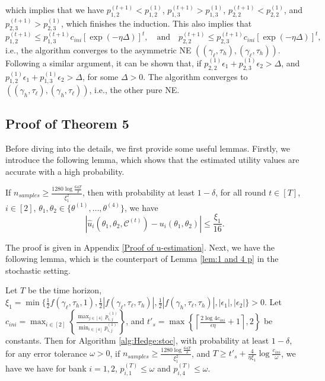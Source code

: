 which implies that we have $p^{(t+1)}_{1,2}< p^{(1)}_{1,2}$,  $p^{(t+1)}_{1,3}> p^{(1)}_{1,3}$, $p^{(t+1)}_{2,2}<p^{(1)}_{2,2}$, and $p^{(t+1)}_{2,3}>p^{(1)}_{2,3}$, which finishes the induction. This also implies that 
\[
p^{(t+1)}_{1,2}\leq p^{(t+1)}_{1,3}c_{ini}\left[\exp(-\eta \Delta)\right]^t, \quad \text{and} \quad p^{(t+1)}_{2,2}\leq p^{(t+1)}_{2,3}c_{ini}\left[\exp(-\eta \Delta)\right]^t,
\]
i.e., the algorithm converges to the asymmetric NE $((\gamma_{\ell},\tau_{h}),(\gamma_{\ell},\tau_{h}))$. Following a similar argument, it can be shown that, if $p^{(1)}_{2,2}\epsilon_1+p^{(1)}_{2,3}\epsilon_2>\Delta$, and $p^{(1)}_{1,2}\epsilon_1+p^{(1)}_{1,3}\epsilon_2>\Delta$, for some $\Delta>0$. The algorithm converges to $((\gamma_{h},\tau_{\ell}),(\gamma_{h},\tau_{\ell}))$, i.e., the other pure NE. \\





\subsection{Proof of Theorem 5}
\label{proof:Theorem 5}
Before diving into the details, we first provide some useful lemmas. Firstly, we introduce the following lemma, which shows that the estimated utility values are accurate with a high probability. 
\begin{lemma}
 \label{lem:u-estimation} 
If $n_{samples}\geq\frac{1280\log\frac{64T}{\delta}}{\xi_1^2}$, 
then with probability at least  $1-\delta$, for all round $t\in[T]$, $i\in[2]$, $\theta_1,\theta_2\in\{\theta^{(1)},\dots,\theta^{(4)} \}$, we have 
$$ \left|\widehat{u}_i(\theta_1, \theta_2, \mathcal{C}^{(t)})-{u}_i(\theta_1, \theta_2)\right|\leq \frac{\xi_1}{16}. $$
\end{lemma}
The proof is given in Appendix \ref{Proof of u-estimation}. Next, we have the following lemma, which is the counterpart of Lemma \ref{lem:1 and 4 p} in the stochastic setting. 
\begin{lemma}
\label{lem:1 and 4 p:stochastic}
Let $T$ be the time horizon, $\xi_1=\min\{\frac{1}{2}f(\gamma_{\ell},\tau_{h},1), \frac{1}{2}\left|f(\gamma_{\ell},\tau_{\ell},\tau_{h})\right|,\frac{1}{2}|f(\gamma_{h},\tau_{\ell},\tau_{h})|, |\epsilon_1|, |\epsilon_2|\}>0.$ Let $c_{ini}=\max_{i\in[2]}\left\{\frac{\max_{j\in[4]}p^{(1)}_{i,j}}{\min_{i\in[4]}p^{(1)}_{i,j}}\right\}$, and $t'_s=\max\left\{\left\lceil\frac{2\log 4c_{ini}}{\epsilon\eta}+1\right\rceil,2\right\}$ be constants. Then for Algorithm \ref{alg:Hedge:stoc}, with probability at least $1-\delta$, for any error tolerance $\omega>0$, if $n_{samples}\geq \frac{1280\log\frac{64T}{\delta}}{\xi_1^2}$, and $T\geq t'_s + \frac{4}{\eta\xi_1}\log\frac{c_{ini}}{\omega}$, we have  we have for bank $i=1,2$, $p^{(T)}_{i,1}\leq \omega$ and $p^{(T)}_{i,4}\leq \omega$. 
\end{lemma}

